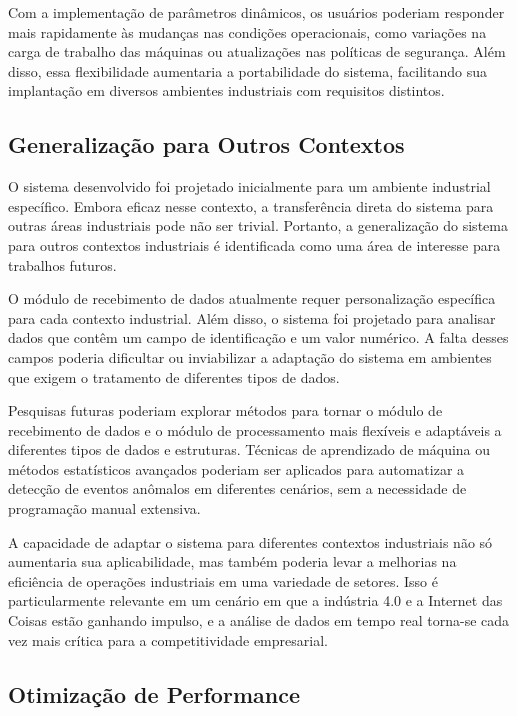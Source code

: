 Com a implementação de parâmetros dinâmicos, os usuários poderiam responder mais rapidamente às mudanças nas condições operacionais, como variações na carga de trabalho das máquinas ou atualizações nas políticas de segurança. Além disso, essa flexibilidade aumentaria a portabilidade do sistema, facilitando sua implantação em diversos ambientes industriais com requisitos distintos.

\subsection{Generalização para Outros Contextos}

O sistema desenvolvido foi projetado inicialmente para um ambiente industrial específico. Embora eficaz nesse contexto, a transferência direta do sistema para outras áreas industriais pode não ser trivial. Portanto, a generalização do sistema para outros contextos industriais é identificada como uma área de interesse para trabalhos futuros.

O módulo de recebimento de dados atualmente requer personalização específica para cada contexto industrial. Além disso, o sistema foi projetado para analisar dados que contêm um campo de identificação e um valor numérico. A falta desses campos poderia dificultar ou inviabilizar a adaptação do sistema em ambientes que exigem o tratamento de diferentes tipos de dados.

Pesquisas futuras poderiam explorar métodos para tornar o módulo de recebimento de dados e o módulo de processamento mais flexíveis e adaptáveis a diferentes tipos de dados e estruturas. Técnicas de aprendizado de máquina ou métodos estatísticos avançados poderiam ser aplicados para automatizar a detecção de eventos anômalos em diferentes cenários, sem a necessidade de programação manual extensiva.

A capacidade de adaptar o sistema para diferentes contextos industriais não só aumentaria sua aplicabilidade, mas também poderia levar a melhorias na eficiência de operações industriais em uma variedade de setores. Isso é particularmente relevante em um cenário em que a indústria 4.0 e a Internet das Coisas estão ganhando impulso, e a análise de dados em tempo real torna-se cada vez mais crítica para a competitividade empresarial.

\subsection{Otimização de Performance}

